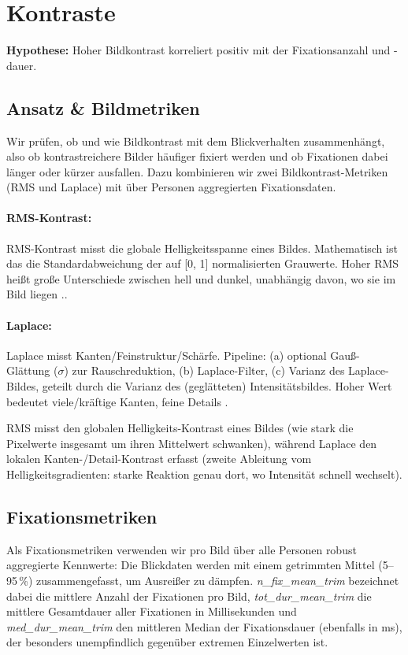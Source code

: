 \documentclass[
    language=german, %
    thesis=seminar, %
    supervisor=postdoc, %
    multiauthor=true, %
    ]{settings/csssa-thesis}
\begin{document}
\section{Kontraste}

\textbf{Hypothese:} Hoher Bildkontrast korreliert positiv mit der Fixationsanzahl und -dauer. 

\subsection{Ansatz \& Bildmetriken}
Wir prüfen, ob und wie Bildkontrast mit dem Blickverhalten zusammenhängt, 
also ob kontrastreichere Bilder häufiger fixiert werden und ob Fixationen dabei länger oder kürzer ausfallen. 
Dazu kombinieren wir zwei Bildkontrast-Metriken (RMS und Laplace) mit über Personen aggregierten Fixationsdaten.

\paragraph{RMS-Kontrast:} 
RMS-Kontrast misst die globale Helligkeitsspanne eines Bildes. Mathematisch ist das die Standardabweichung der auf [0, 1] normalisierten Grauwerte. 
Hoher RMS heißt große Unterschiede zwischen hell und dunkel, unabhängig davon, wo sie im Bild liegen \cite{Kukkonen1993}.. 

\paragraph{Laplace:}
Laplace misst Kanten/Feinstruktur/Schärfe. Pipeline: (a) optional Gauß-Glättung ($\sigma$) zur Rauschreduktion, (b) Laplace-Filter, (c) Varianz des Laplace-Bildes, 
geteilt durch die Varianz des (geglätteten) Intensitätsbildes. Hoher Wert bedeutet viele/kräftige Kanten, feine Details \citep{Starnes2023}. 

RMS misst den globalen Helligkeits-Kontrast eines Bildes (wie stark die Pixelwerte insgesamt um ihren Mittelwert schwanken),
während Laplace den lokalen Kanten-/Detail-Kontrast erfasst (zweite Ableitung vom Helligkeitsgradienten: starke Reaktion genau dort, wo Intensität schnell wechselt).

\subsection{Fixationsmetriken}
Als Fixationsmetriken verwenden wir pro Bild über alle Personen robust aggregierte Kennwerte: Die Blickdaten werden mit einem getrimmten Mittel (5–95\,\%) zusammengefasst, um Ausreißer zu dämpfen. 
\textit{n\_fix\_mean\_trim} bezeichnet dabei die mittlere Anzahl der Fixationen pro Bild, \textit{tot\_dur\_mean\_trim} die mittlere Gesamtdauer aller Fixationen in Millisekunden und \textit{med\_dur\_mean\_trim} den mittleren Median der Fixationsdauer (ebenfalls in ms), 
der besonders unempfindlich gegenüber extremen Einzelwerten ist.
\end{document}
